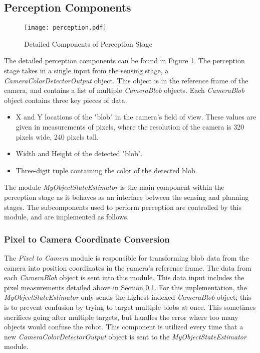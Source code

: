 \documentclass{article}
\begin{document}
\subsection{Perception Components} \label{sec:comp_perception}
\begin{figure}[h]
\begin{center}
\texttt{[image: perception.pdf]}
\caption{\label{fig:percepton} Detailed Components of Perception Stage}
\end{center}
\end{figure}
The detailed perception components can be found in Figure \ref{fig:percepton}. The perception stage takes in a single input from the sensing stage, a \emph{CameraColorDetectorOutput} object. This object is in the reference frame of the camera, and contains a list of multiple \emph{CameraBlob} objects. Each \emph{CameraBlob} object contains three key pieces of data.
\begin{itemize}
\item X and Y locations of the "blob" in the camera's field of view. These values are given in measurements of pixels, where the resolution of the camera is 320 pixels wide, 240 pixels tall.
\item Width and Height of the detected "blob".
\item Three-digit tuple containing the color of the detected blob. 
\end{itemize}
The module \emph{MyObjectStateEstimator} is the main component within the perception stage as it behaves as an interface between the sensing and planning stages. The subcomponents used to perform perception are controlled by this module, and are implemented as follows.

\subsubsection*{Pixel to Camera Coordinate Conversion}
The \emph{Pixel to Camera} module is responsible for transforming blob data from the camera into position coordinates in the camera's reference frame. The data from each \emph{CameraBlob} object is sent into this module. This data input includes the pixel measurements detailed above in Section \ref{sec:comp_perception}. For this implementation, the \emph{MyObjectStateEstimator} only sends the highest indexed \emph{CameraBlob} object; this is to prevent confusion by trying to target multiple blobs at once. This sometimes sacrifices going after multiple targets, but handles the error where too many objects would confuse the robot. This component is utilized every time that a new \emph{CameraColorDetectorOutput} object is sent to the \emph{MyObjectStateEstimator} module. \par
\end{document}
